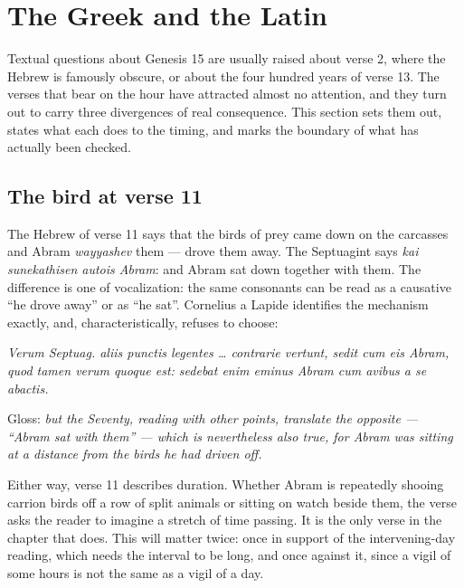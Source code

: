 \section{The Greek and the Latin}

Textual questions about Genesis 15 are usually raised about verse 2, where the
Hebrew is famously obscure, or about the four hundred years of verse 13. The
verses that bear on the hour have attracted almost no attention, and they turn
out to carry three divergences of real consequence. This section sets them out,
states what each does to the timing, and marks the boundary of what has actually
been checked.

\subsection{The bird at verse 11}

The Hebrew of verse 11 says that the birds of prey came down on the carcasses
and Abram \textit{wayyashev} them --- drove them away. The Septuagint says
\textit{kai sunekathisen autois Abram}: and Abram sat down together with them.
The difference is one of vocalization: the same consonants can be read as a
causative ``he drove away'' or as ``he sat''. Cornelius a Lapide identifies the
mechanism exactly, and, characteristically, refuses to choose:

\begin{studyframe}
\textit{Verum Septuag. aliis punctis legentes \dots{} contrarie vertunt, sedit
cum eis Abram, quod tamen verum quoque est: sedebat enim eminus Abram cum avibus
a se abactis.}
\end{studyframe}

\noindent Gloss: \emph{but the Seventy, reading with other points, translate the
opposite --- ``Abram sat with them'' --- which is nevertheless also true, for
Abram was sitting at a distance from the birds he had driven off.}

Either way, verse 11 describes duration. Whether Abram is repeatedly shooing
carrion birds off a row of split animals or sitting on watch beside them, the
verse asks the reader to imagine a stretch of time passing. It is the only verse
in the chapter that does. This will matter twice: once in support of the
intervening-day reading, which needs the interval to be long, and once against
it, since a vigil of some hours is not the same as a vigil of a day.

